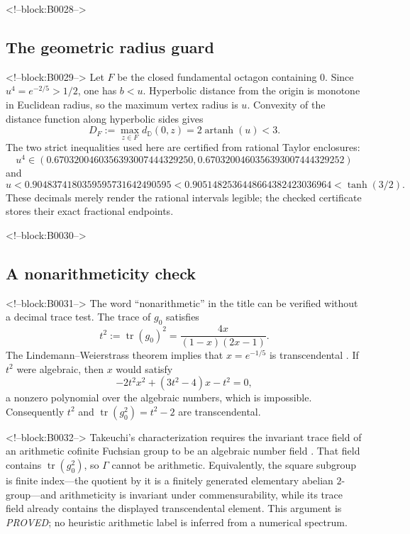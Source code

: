 \documentclass[11pt,a4paper]{article}
\theoremstyle{definition}
\newcommand{\D}{\mathbb D}
\newcommand{\tr}{\operatorname{tr}}
\begin{document}
<!--block:B0028-->
\subsection{The geometric radius guard}

<!--block:B0029-->
Let \(F\) be the closed fundamental octagon containing \(0\).  Since
\(u^4=e^{-2/5}>1/2\), one has \(b<u\).  Hyperbolic distance from the origin is
monotone in Euclidean radius, so the maximum vertex radius is \(u\).  Convexity
of the distance function along hyperbolic sides gives
\begin{equation}\label{eq:DF}
 D_F:=\max_{z\in F}d_{\D}(0,z)=2\operatorname{artanh}(u)<3.
\end{equation}
The two strict inequalities used here are certified from rational Taylor
enclosures:
\[
 u^4\in(0.6703200460356393007444329250,
        0.6703200460356393007444329252)
\]
and
\[
 u<0.9048374180359595731642490595
   <0.9051482536448664382423036964<\tanh(3/2).
\]
These decimals merely render the rational intervals legible; the checked
certificate stores their exact fractional endpoints.

<!--block:B0030-->
\subsection{A nonarithmeticity check}

<!--block:B0031-->
The word ``nonarithmetic'' in the title can be verified without a decimal
trace test.  The trace of \(g_0\) satisfies
\begin{equation}\label{eq:t2}
 t^2:=\tr(g_0)^2
 =\frac{4x}{(1-x)(2x-1)}.
\end{equation}
The Lindemann--Weierstrass theorem implies that \(x=e^{-1/5}\) is
transcendental \cite[Cor.~3.2]{Popescu2024}.  If \(t^2\) were algebraic, then
\(x\) would satisfy
\begin{equation}\label{eq:quadratic-x}
 -2t^2x^2+(3t^2-4)x-t^2=0,
\end{equation}
a nonzero polynomial over the algebraic numbers, which is impossible.
Consequently \(t^2\) and \(\tr(g_0^2)=t^2-2\) are transcendental.

<!--block:B0032-->
Takeuchi's characterization requires the invariant trace field of an
arithmetic cofinite Fuchsian group to be an algebraic number field
\cite[Thm.~1 and condition~(i)]{Takeuchi1975}.  That field contains
\(\tr(g_0^2)\), so \(\Gamma\) cannot be arithmetic.  Equivalently, the square
subgroup is finite index---the quotient by it is a finitely generated
elementary abelian \(2\)-group---and arithmeticity is invariant under
commensurability, while its trace field already contains the displayed
transcendental element.  This argument is \emph{PROVED}; no heuristic
arithmetic label is inferred from a numerical spectrum.
\end{document}
